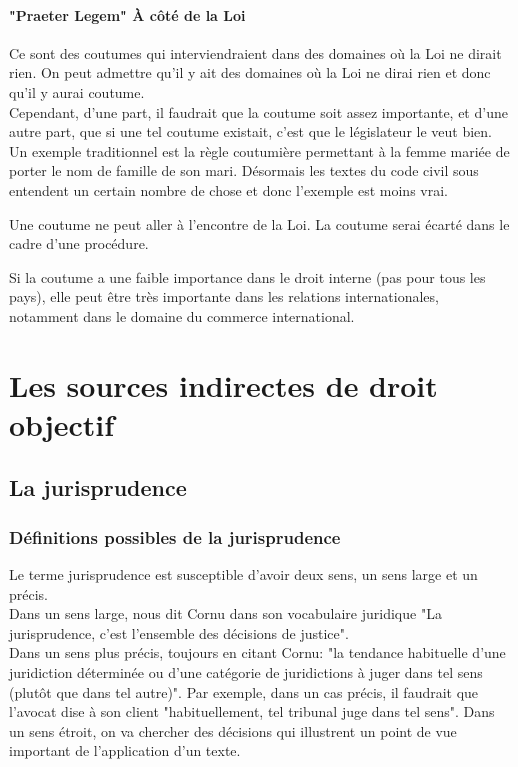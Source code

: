 \documentclass[12pt, a4paper, openany]{book}
\begin{document}
\subsection{"Praeter Legem" À côté de la Loi}

Ce sont des coutumes qui interviendraient dans des domaines où la Loi ne dirait rien. On peut admettre qu'il y ait des domaines où la Loi ne dirai rien et donc qu'il y aurai coutume. \\
Cependant, d'une part, il faudrait que la coutume soit assez importante, et d'une autre part, que si une tel coutume existait, c'est que le législateur le veut bien. \\
Un exemple traditionnel est la règle coutumière permettant à la femme mariée de porter le nom de famille de son mari. Désormais les textes du code civil sous entendent un certain nombre de chose et donc l'exemple est moins vrai.


Une coutume ne peut aller à l'encontre de la Loi. La coutume serai écarté dans le cadre d'une procédure.


Si la coutume a une faible importance dans le droit interne (pas pour tous les pays), elle peut être très importante dans les relations internationales, notamment dans le domaine du commerce international.


\part{Les sources indirectes de droit objectif}

\chapter{La jurisprudence}
\section{Définitions possibles de la jurisprudence}
Le terme jurisprudence est susceptible d'avoir deux sens, un sens large et un précis. \\
Dans un sens large, nous dit Cornu dans son vocabulaire juridique "La jurisprudence, c'est l'ensemble des décisions de justice". \\
Dans un sens plus précis, toujours en citant Cornu: "la tendance habituelle d'une juridiction déterminée ou d'une catégorie de juridictions à juger dans tel sens (plutôt que dans tel autre)". Par exemple, dans un cas précis, il faudrait que l'avocat dise à son client "habituellement, tel tribunal juge dans tel sens". Dans un sens étroit, on va chercher des décisions qui illustrent un point de vue important de l'application d'un texte.
\end{document}
